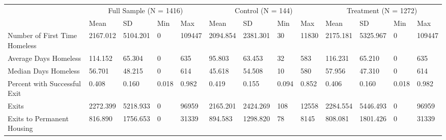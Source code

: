 \begin{tabular}{lllllllllllll}
\toprule
 & \multicolumn{4}{c}{Full Sample (N = 1416)} & \multicolumn{4}{c}{Control (N = 144)} & \multicolumn{4}{c}{Treatment (N = 1272)} \\
 & Mean & SD & Min & Max & Mean & SD & Min & Max & Mean & SD & Min & Max \\
\midrule
Number of First Time Homeless & 2167.012 & 5104.201 & 0 & 109447 & 2094.854 & 2381.301 & 30 & 11830 & 2175.181 & 5325.967 & 0 & 109447 \\
Average Days Homeless & 114.152 & 65.304 & 0 & 635 & 95.803 & 63.453 & 32 & 583 & 116.231 & 65.210 & 0 & 635 \\
Median Days Homeless & 56.701 & 48.215 & 0 & 614 & 45.618 & 54.508 & 10 & 580 & 57.956 & 47.310 & 0 & 614 \\
Percent with Successful Exit & 0.408 & 0.160 & 0.018 & 0.982 & 0.419 & 0.155 & 0.094 & 0.852 & 0.406 & 0.160 & 0.018 & 0.982 \\
Exits & 2272.399 & 5218.933 & 0 & 96959 & 2165.201 & 2424.269 & 108 & 12558 & 2284.554 & 5446.493 & 0 & 96959 \\
Exits to Permanent Housing & 816.890 & 1756.653 & 0 & 31339 & 894.583 & 1298.820 & 78 & 8145 & 808.081 & 1801.426 & 0 & 31339 \\
\bottomrule
\end{tabular}
